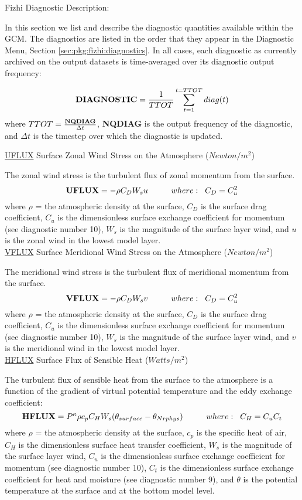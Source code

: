 \newpage

Fizhi Diagnostic Description:

In this section we list and describe the diagnostic quantities available within the 
GCM.  The diagnostics are listed in the order that they appear in the 
Diagnostic Menu, Section \ref{sec:pkg:fizhi:diagnostics}.
In all cases, each diagnostic as currently archived on the output datasets
is time-averaged over its diagnostic output frequency:

\[
{\bf DIAGNOSTIC} = \frac{1}{TTOT} \sum_{t=1}^{t=TTOT} diag(t)
\]
where $TTOT = \frac{ {\bf NQDIAG} }{\Delta t}$, {\bf NQDIAG} is the 
output frequency of the diagnostic, and $\Delta t$ is
the timestep over which the diagnostic is updated.  

{ \underline {UFLUX} Surface Zonal Wind Stress on the Atmosphere ($Newton/m^2$) } 

The zonal wind stress is the turbulent flux of zonal momentum from 
the surface. 
\[
{\bf UFLUX} =  - \rho C_D W_s u \hspace{1cm}where: \hspace{.2cm}C_D = C^2_u
\]
where $\rho$ = the atmospheric density at the surface, $C_{D}$ is the surface
drag coefficient, $C_u$ is the dimensionless surface exchange coefficient for momentum 
(see diagnostic number 10), $W_s$ is the magnitude of the surface layer wind, and $u$ is 
the zonal wind in the lowest model layer.
\\


{ \underline {VFLUX} Surface Meridional Wind Stress on the Atmosphere ($Newton/m^2$) } 

The meridional wind stress is the turbulent flux of meridional momentum from 
the surface. 
\[
{\bf VFLUX} =  - \rho C_D W_s v \hspace{1cm}where: \hspace{.2cm}C_D = C^2_u
\]
where $\rho$ = the atmospheric density at the surface, $C_{D}$ is the surface
drag coefficient, $C_u$ is the dimensionless surface exchange coefficient for momentum 
(see diagnostic number 10), $W_s$ is the magnitude of the surface layer wind, and $v$ is 
the meridional wind in the lowest model layer.
\\

{ \underline {HFLUX} Surface Flux of Sensible Heat ($Watts/m^2$) } 

The turbulent flux of sensible heat from the surface to the atmosphere is a function of the
gradient of virtual potential temperature and the eddy exchange coefficient:
\[
{\bf HFLUX} =  P^{\kappa}\rho c_{p} C_{H} W_s (\theta_{surface} - \theta_{Nrphys})
\hspace{1cm}where: \hspace{.2cm}C_H = C_u C_t
\]
where $\rho$ = the atmospheric density at the surface, $c_{p}$ is the specific
heat of air, $C_{H}$ is the dimensionless surface heat transfer coefficient, $W_s$ is the 
magnitude of the surface layer wind, $C_u$ is the dimensionless surface exchange coefficient 
for momentum (see diagnostic number 10), $C_t$ is the dimensionless surface exchange coefficient 
for heat and moisture (see diagnostic number 9), and $\theta$ is the potential temperature 
at the surface and at the bottom model level.
\\



